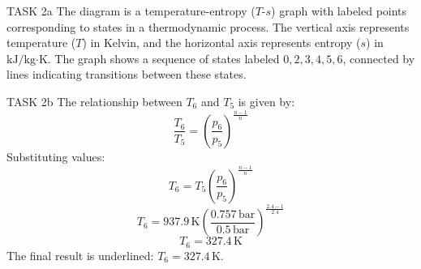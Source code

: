 TASK 2a  
The diagram is a temperature-entropy (\( T \)-\( s \)) graph with labeled points corresponding to states in a thermodynamic process. The vertical axis represents temperature (\( T \)) in Kelvin, and the horizontal axis represents entropy (\( s \)) in \( \text{kJ}/\text{kg·K} \). The graph shows a sequence of states labeled \( 0, 2, 3, 4, 5, 6 \), connected by lines indicating transitions between these states.  

TASK 2b  
The relationship between \( T_6 \) and \( T_5 \) is given by:  
\[
\frac{T_6}{T_5} = \left( \frac{p_6}{p_5} \right)^{\frac{n-1}{n}}
\]  
Substituting values:  
\[
T_6 = T_5 \left( \frac{p_6}{p_5} \right)^{\frac{n-1}{n}}
\]  
\[
T_6 = 937.9 \, \text{K} \left( \frac{0.757 \, \text{bar}}{0.5 \, \text{bar}} \right)^{\frac{2.4-1}{2.4}}
\]  
\[
T_6 = 327.4 \, \text{K}
\]  
The final result is underlined: \( T_6 = 327.4 \, \text{K} \).